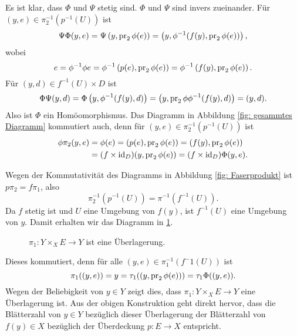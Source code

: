 \documentclass[a4paper,10pt]{article}
\begin{document}
Es ist klar, dass $\Phi$ und $\Psi$ stetig sind. $\Phi$ und $\Psi$ sind invers zueinander. Für $(y,e) \in \pi_2^{-1}(p^{-1}(U))$ ist
\[
 \Psi \Phi (y,e)
 = \Psi \left( y, \operatorname{pr}_2 \phi(e) \right)
 = \left( y, \phi^{-1}(f(y), \operatorname{pr}_2 \phi(e)) \right),
\]
wobei
\[
 e
 = \phi^{-1} \phi e
 = \phi^{-1}\left( p(e), \operatorname{pr}_2 \phi(e) \right)
 = \phi^{-1}\left( f(y), \operatorname{pr}_2 \phi(e) \right).
\]
Für $(y,d) \in f^{-1}(U) \times D$ ist
\[
 \Phi \Psi (y,d)
 = \Phi\left( y, \phi^{-1}(f(y),d) \right)
 = \left( y, \operatorname{pr}_2 \phi \phi^{-1}(f(y),d) \right)
 = (y,d).
\]
Also ist $\Phi$ ein Homöomorphismus. Das Diagramm in Abbildung \ref{fig: gesammtes Diagramm} kommutiert auch, denn für $(y,e) \in \pi_2^{-1}(p^{-1}(U))$ ist
\begin{align*}
 \phi \pi_2 (y,e)
 &= \phi(e)
 = (p(e), \operatorname{pr}_2 \phi(e))
 = (f(y), \operatorname{pr}_2 \phi(e)) \\
 &= (f \times \operatorname{id}_D) (y, \operatorname{pr}_2 \phi(e))
 = (f \times \operatorname{id}_D) \Phi (y,e).
\end{align*}

Wegen der Kommutativität des Diagramms in Abbildung \ref{fig: Faserprodukt} ist $p \pi_2 = f \pi_1$, also
\[
 \pi_2^{-1}(p^{-1}(U)) = \pi^{-1}(f^{-1}(U)).
\]
Da $f$ stetig ist und $U$ eine Umgebung von $f(y)$, ist $f^{-1}(U)$ eine Umgebung von $y$. Damit erhalten wir das Diagramm in \ref{fig: Überlagerung für f^-1 U}.
\begin{figure}[h]\centering
 \caption{$\pi_1 : Y \times_X E \to Y$ ist eine Überlagerung.}
 \label{fig: Überlagerung für f^-1 U}
\end{figure}
Dieses kommutiert, denn für alle $(y,e) \in \pi_1^{-1}(f^-1(U))$ ist
\[
 \pi_1((y,e)) = y = \tau_1( (y, \operatorname{pr}_2 \phi(e)) ) = \tau_1 \Phi((y,e)).
\]
Wegen der Beliebigkeit von $y \in Y$ zeigt dies, dass $\pi_1 : Y \times_X E \to Y$ eine Überlagerung ist. Aus der obigen Konstruktion geht direkt hervor, dass die Blätterzahl von $y \in Y$ bezüglich dieser Überlagerung der Blätterzahl von $f(y) \in X$ bezüglich der Überdeckung $p : E \to X$ entspricht.
\end{document}
